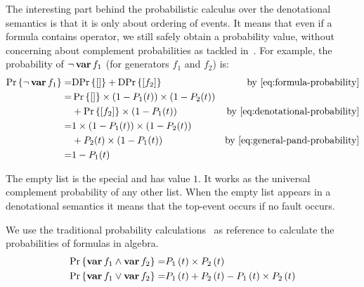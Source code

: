 \documentclass[12pt,openright,twoside,a4paper,oldfontcommands,english,brazil,final]{abntex2}
\theoremstyle{theo}
\def\varop{\ensuremath\operatorname{\mathbf{var}}}
\newcommand{\var}[1]{\ensuremath\varop #1}
\def\probabilityop{\ensuremath \Pr}
\newcommand{\probability}[1]{\ensuremath \probabilityop\left\{#1\right\}}
\def\denotationalprobop{\ensuremath\mathrm{DPr}}
\newcommand{\denotationalprob}[1]{\ensuremath \denotationalprobop\left\{#1\right\}}
\newcommand{\Fit}[1]{\ensuremath P_{#1}\left(t\right)}
\newcommand{\vari}[1]{\ensuremath\var{f_{#1}}}
\begin{document}
The interesting part behind the probabilistic calculus over the denotational semantics is that it is only about ordering of events.
It means that even if a formula contains  operator, we still safely obtain a probability value, without concerning about complement probabilities as tackled in~\cite{Andrews2001}.
For example, the probability of $\lnot \var{f_1}$ (for generators $f_1$ and $f_2$) is:
%
\begin{align}
\probability{\lnot \var{f_1}} = & \denotationalprob{\left[\right]} + \denotationalprob{\left[f_2\right]} & \text{by \cref{eq:formula-probability}} \nonumber\\
= &\probability{\left[\right]}\times\left(1 - P_1(t)\right)\times\left(1 - P_2(t)\right)\nonumber\\
& + \probability{\left[f_2\right]}\times\left(1 - P_1(t)\right) & \text{by \cref{eq:denotational-probability}} \nonumber\\
= & 1 \times \left(1- P_1(t)\right) \times \left(1 - P_2(t)\right)\nonumber\\
& + P_2(t) \times \left(1 - P_1(t)\right) & \text{by \cref{eq:general-pand-probability}}\nonumber\\
= & 1 - P_1(t)
\end{align}

The empty list is the special and has value $1$.
It works as the universal complement probability of any other list.
When the empty list appears in a denotational semantics it means that the top-event occurs if no fault occurs.

We use the traditional probability calculations~\cite{Merle2010} as reference to calculate the probabilities of formulas in \ac{algebra}.
\begin{subequations}
\begin{align}
\probability{\vari{1} \land \vari{2}} = & \Fit{1} \times \Fit{2}\label{eq:and-probability}\\
\probability{\vari{1} \lor \vari{2}} = & \Fit{1} + \Fit{2} - \Fit{1} \times \Fit{2}\label{eq:or-probability}
\end{align}
\end{subequations}
\end{document}
